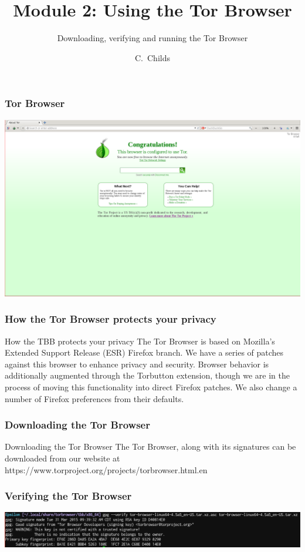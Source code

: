 \documentclass{beamer}
\title[Module 2: Tor Browser]
{Module 2: Using the Tor Browser}
\subtitle{Downloading, verifying and running the Tor Browser}
\author[C. Childs]
{C.~Childs\inst{1}}
\institute[Tor Project]
{
  \inst{1}
  Support coordinator / Translation coordinator\\
  The Tor Project
}
\begin{document}
\frame{\titlepage}

\begin{frame}
	\frametitle{Tor Browser}
	\begin{center}
		\includegraphics[width= \paperwidth]{shots/generic/browser.png}
	\end{center}
\end{frame}

\begin{frame}
\frametitle{How the Tor Browser protects your privacy}
	\begin{block}{How the TBB protects your privacy}
The Tor Browser is based on Mozilla's Extended Support Release (ESR) Firefox branch. We have a series of patches against this browser to enhance privacy and security. Browser behavior is additionally augmented through the Torbutton extension, though we are in the process of moving this functionality into direct Firefox patches. We also change a number of Firefox preferences from their defaults.
	\end{block}
\end{frame}

\begin{frame}
\frametitle{Downloading the Tor Browser}
        \begin{block}{Downloading the Tor Browser}
The Tor Browser, along with its signatures can be downloaded from our website at https://www.torproject.org/projects/torbrowser.html.en
        \end{block}
\end{frame}

\begin{frame}
\frametitle{Verifying the Tor Browser}
        \begin{center}
                \includegraphics[width= \paperwidth]{shots/linux/verify.png}
        \end{center}
\end{frame}
\end{document}
